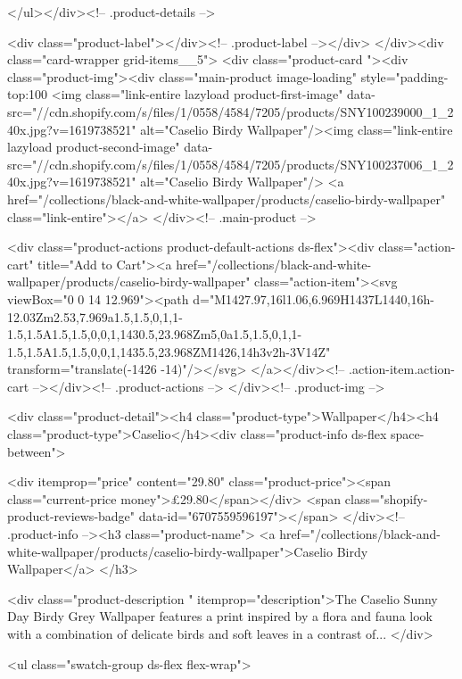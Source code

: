 {{{{{{{      </ul></div><!-- .product-details -->

<div class="product-label"></div><!-- .product-label --></div>
          </div><div class="card-wrapper grid-items__5">
            <div class="product-card "><div class="product-img"><div class="main-product image-loading" style="padding-top:100%
      <img class="link-entire lazyload product-first-image" data-src="//cdn.shopify.com/s/files/1/0558/4584/7205/products/SNY100239000_1_240x.jpg?v=1619738521" alt="Caselio Birdy Wallpaper"/><img class="link-entire lazyload product-second-image" data-src="//cdn.shopify.com/s/files/1/0558/4584/7205/products/SNY100237006_1_240x.jpg?v=1619738521" alt="Caselio Birdy Wallpaper"/>
      <a href="/collections/black-and-white-wallpaper/products/caselio-birdy-wallpaper" class="link-entire"></a>
    </div><!-- .main-product -->
  
<div class="product-actions product-default-actions ds-flex"><div class="action-cart" title="Add to Cart"><a href="/collections/black-and-white-wallpaper/products/caselio-birdy-wallpaper" class="action-item"><svg viewBox="0 0 14 12.969"><path d="M1427.97,16l1.06,6.969H1437L1440,16h-12.03Zm2.53,7.969a1.5,1.5,0,1,1-1.5,1.5A1.5,1.5,0,0,1,1430.5,23.968Zm5,0a1.5,1.5,0,1,1-1.5,1.5A1.5,1.5,0,0,1,1435.5,23.968ZM1426,14h3v2h-3V14Z" transform="translate(-1426 -14)"/></svg>
</a></div><!-- .action-item.action-cart --></div><!-- .product-actions -->
</div><!-- .product-img -->

<div class="product-detail"><h4 class="product-type">Wallpaper</h4><h4 class="product-type">Caselio</h4><div class="product-info ds-flex space-between">
    
<div itemprop="price" content="29.80" class="product-price"><span class="current-price money">£29.80</span></div>
    <span class="shopify-product-reviews-badge" data-id="6707559596197"></span>
  </div><!-- .product-info --><h3 class="product-name">
      <a href="/collections/black-and-white-wallpaper/products/caselio-birdy-wallpaper">Caselio Birdy Wallpaper</a>
    </h3>
    
<div class="product-description " itemprop="description">The Caselio Sunny Day Birdy Grey Wallpaper features a print inspired by a flora and fauna look with a combination of delicate birds and soft leaves in a contrast of...
</div>



<ul class="swatch-group ds-flex flex-wrap">
        
}}}}}}}

